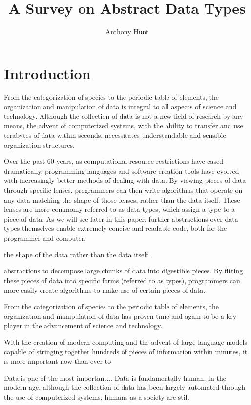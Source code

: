 \documentclass{article}
\title{A Survey on Abstract Data Types}
\author{Anthony Hunt}
\begin{document}
\maketitle

\section{Introduction}

From the categorization of species to the periodic table of elements, the organization and manipulation
of data is integral to all aspects of science and technology. Although the collection of data is not a
new field of research by any means, the advent of computerized systems, with the ability to transfer and use
terabytes of data within seconds, necessitates understandable and sensible organization structures.

Over the past 60 years, as computational resource restrictions have eased dramatically,
programming languages and software creation tools have evolved with increasingly better methods of dealing with data.
By viewing pieces of data through specific lenses, programmers can then write algorithms that operate on
any data matching the shape of those lenses, rather than the data itself. These lenses are more commonly referred to as
data types, which assign a type to a piece of data. As we will see later in this paper,
further abstractions over data types themselves enable extremely concise and readable code,
both for the programmer and computer.


the shape of the data rather than the data itself.

abstractions
to decompose large chunks of data into digestible pieces. By fitting these pieces of data into specific forms
(referred to as types), programmers can more easily create algorithms to make use of certain pieces of data.


From the categorization of species to the periodic table of elements, the organization and manipulation
of data has proven time and again to be a key player in the advancement of science and technology.



With the creation of modern computing and the advent of large language models capable of stringing
together hundreds of pieces of information within minutes, it is more important now than ever to



Data is one of the most important...
Data is fundamentally human.
In the modern age, although the collection of data has been largely automated through the use of
computerized systems, humans as a society are still
\end{document}
